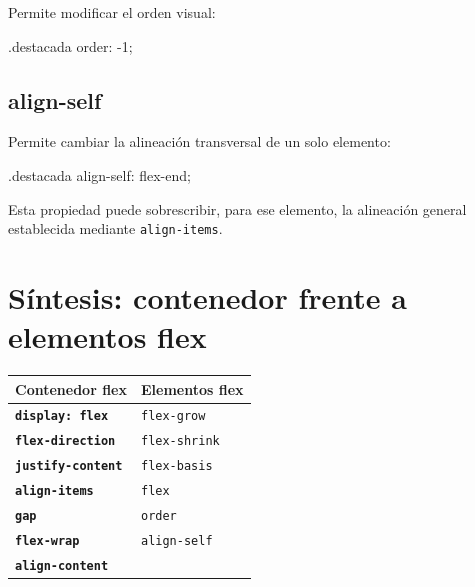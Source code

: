 \documentclass[11pt]{article}
\begin{document}
    Permite modificar el orden visual:

    \begin{csscodedark}
        .destacada {
            order: -1;
        }
    \end{csscodedark}


    \subsection{align-self}

    Permite cambiar la alineación transversal de un solo elemento:

    \begin{csscodedark}
        .destacada {
            align-self: flex-end;
        }
    \end{csscodedark}

    Esta propiedad puede sobrescribir, para ese elemento, la alineación general establecida mediante \texttt{align-items}.

    \section{Síntesis: contenedor frente a elementos flex}

    \begin{center}
        \begin{tabularx}{0.5\textwidth}{>{\bfseries}p{4.2cm}X}
            \toprule
            Contenedor flex & Elementos flex \\
            \midrule
            \texttt{display: flex} & \texttt{flex-grow} \\
            \texttt{flex-direction} & \texttt{flex-shrink} \\
            \texttt{justify-content} & \texttt{flex-basis} \\
            \texttt{align-items} & \texttt{flex} \\
            \texttt{gap} & \texttt{order} \\
            \texttt{flex-wrap} & \texttt{align-self} \\
            \texttt{align-content} &  \\
            \bottomrule
        \end{tabularx}
    \end{center}
\end{document}
